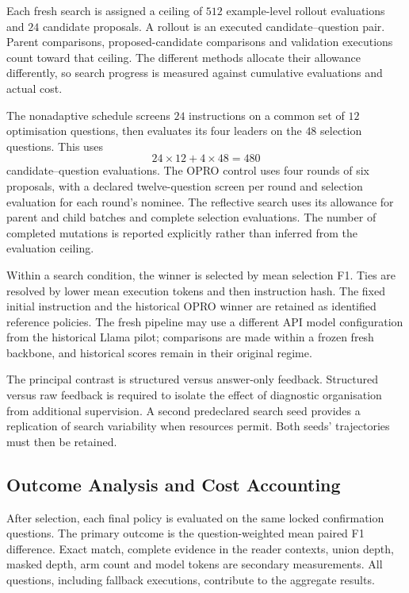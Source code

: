 Each fresh search is assigned a ceiling of $512$ example-level rollout
evaluations and $24$ candidate proposals. A rollout is an executed
candidate--question pair. Parent comparisons, proposed-candidate comparisons
and validation executions count toward that ceiling. The different methods
allocate their allowance differently, so search progress is measured against
cumulative evaluations and actual cost.

The nonadaptive schedule screens $24$ instructions on a common set of
$12$ optimisation questions, then evaluates its four leaders on the $48$
selection questions. This uses
\begin{equation}
  24\times12+4\times48=480
  \label{eq:ch5-budget}
\end{equation}
candidate--question evaluations. The OPRO control uses four rounds of six
proposals, with a declared twelve-question screen per round and selection
evaluation for each round's nominee. The reflective search uses its allowance
for parent and child batches and complete selection evaluations. The number
of completed mutations is reported explicitly rather than inferred from
the evaluation ceiling.

Within a search condition, the winner is selected by mean selection F1.
Ties are resolved by lower mean execution tokens and then instruction hash.
The fixed initial instruction and the historical OPRO winner are retained
as identified reference policies. The fresh pipeline may use a different
API model configuration from the historical Llama pilot; comparisons are
made within a frozen fresh backbone, and historical scores remain in their
original regime.

The principal contrast is structured versus answer-only feedback. Structured
versus raw feedback is required to isolate the effect of diagnostic
organisation from additional supervision. A second predeclared search seed
provides a replication of search variability when resources permit. Both
seeds' trajectories must then be retained.

\subsection{Outcome Analysis and Cost Accounting}

After selection, each final policy is evaluated on the same locked
confirmation questions. The primary outcome is the question-weighted mean
paired F1 difference. Exact match, complete evidence in the reader contexts,
union depth, masked depth, arm count and model tokens are secondary
measurements. All questions, including fallback executions, contribute to
the aggregate results.

